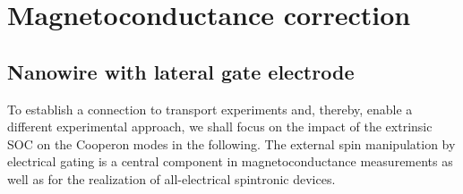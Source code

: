 \documentclass[superscriptaddress,noshowpacs,noshowkeys, twocolumn, floatfix,aps, prb,reprint]{revtex4-1}
\begin{document}
\section{Magnetoconductance correction}

\subsection{Nanowire with lateral gate electrode}\label{sec:gate}


To establish a connection to transport experiments and, thereby, enable a different experimental approach, we shall focus on the impact of the extrinsic SOC on the Cooperon modes in the following.
The external spin manipulation by electrical gating is a central component in magnetoconductance measurements as well as for the realization of all-electrical spintronic devices.
\end{document}

